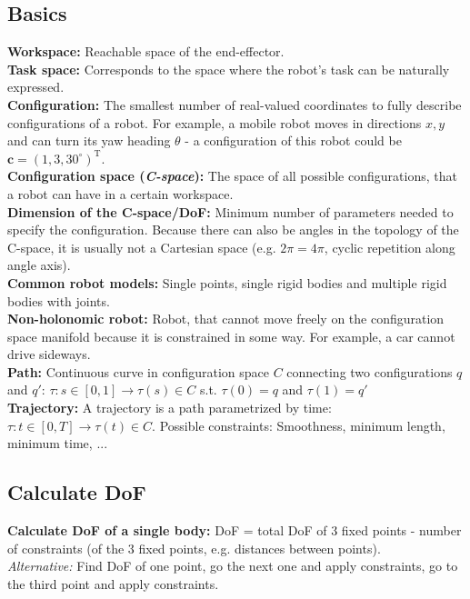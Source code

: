 \begin{multicols*}{2}
\subsection{Basics}
\textbf{Workspace:} Reachable space of the end-effector. \\
\textbf{Task space:} Corresponds to the space where the robot's task can be naturally expressed. \\
\textbf{Configuration:} The smallest number of real-valued coordinates to fully describe configurations of a robot. For example, a mobile robot moves in directions $x,y$ and can turn its yaw heading $\theta$ - a configuration of this robot could be $\mathbold{c} = (1,3,30^\circ)^\mathrm{T}$. \\
\textbf{Configuration space (\textit{C-space}):} The space of all possible configurations, that a robot can have in a certain workspace. \\
\textbf{Dimension of the C-space/DoF:} Minimum number of parameters needed to specify the configuration. Because there can also be angles in the topology of the C-space, it is usually not a Cartesian space (e.g. $2\pi = 4\pi$, cyclic repetition along angle axis). \\
\textbf{Common robot models:} Single points, single rigid bodies and multiple rigid bodies with joints. \\
\textbf{Non-holonomic robot:} Robot, that cannot move freely on the
configuration space manifold because it is constrained in some way. For example, a car cannot drive sideways. \\
\textbf{Path:} Continuous curve in configuration space $C$ connecting two configurations $q$ and $q'$:
$\tau: s \in [0,1] \rightarrow \tau(s) \in C$ s.t. $\tau(0) = q$ and $\tau(1) = q'$\\
\textbf{Trajectory:} A trajectory is a path parametrized by time:
$\tau: t \in [0, T] \rightarrow \tau(t) \in C$.
Possible constraints: Smoothness, minimum length, minimum time, ...

\subsection{Calculate DoF}
\textbf{Calculate DoF of a single body:}
DoF = total DoF of 3 fixed points - number of constraints (of the 3 fixed points, e.g. distances between points). \\
\textit{Alternative:} Find DoF of one point, go the next one and apply constraints, go to the third point and apply constraints. \par


\end{multicols*}
